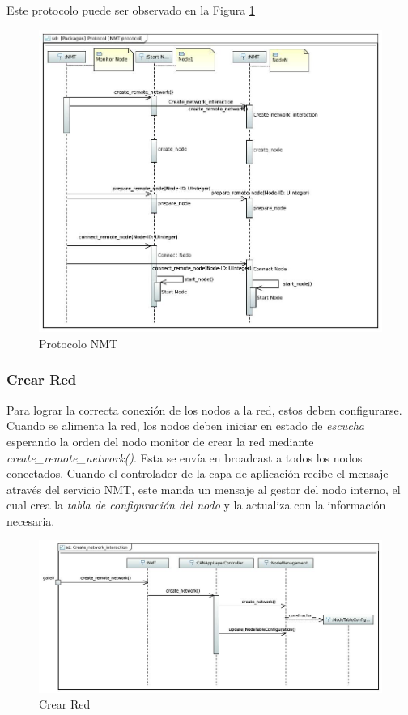 Este protocolo puede ser observado en la Figura \ref{fig:ProtocolNMTConnectNet}
\begin{figure}[h!]
 \centering
 \includegraphics[scale=0.4]{images/Secciones/AppendixA/Protocol_NMT.JPG}
  \caption{Protocolo NMT}
  \label{fig:ProtocolNMTConnectNet}
\end{figure} 

\subsubsection{Crear Red}\label{NMT:crear_red}
Para lograr la correcta conexión de los nodos a la red, estos deben
configurarse. Cuando se alimenta la red, los nodos deben iniciar en estado de
\textit{escucha} esperando la orden del nodo monitor de crear la red mediante
\textit{create\_remote\_network()}. Esta se envía en broadcast a todos los nodos
conectados. Cuando el controlador de la capa de aplicación recibe el mensaje
através del servicio NMT, este manda un mensaje al gestor del nodo interno, el
cual crea la \textit{tabla de configuración del nodo} y la  actualiza con la
información necesaria.

\begin{figure}[h!]
 \centering
 \includegraphics[scale=0.4]{images/Secciones/AppendixA/Create_Network.JPG}
  \caption{Crear Red}
  \label{fig:CreateNetwork}
\end{figure} 


